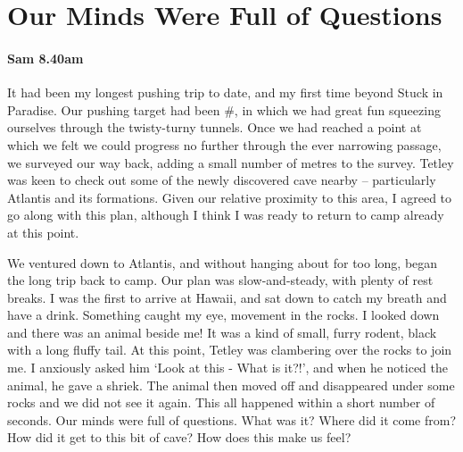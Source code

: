 \begin{marginfigure}
\end{marginfigure}

\section{Our Minds Were Full of Questions}

\paragraph{Sam 8.40am}

It had been my longest pushing trip to date, and my first time beyond Stuck in Paradise. Our pushing target had been \#, in which we had great fun squeezing ourselves through the twisty-turny tunnels. Once we had reached a point at which we felt we could progress no further through the ever narrowing passage, we surveyed our way back, adding a small number of metres to the survey. Tetley was keen to check out some of the newly discovered cave nearby – particularly Atlantis and its formations. Given our relative proximity to this area, I agreed to go along with this plan, although I think I was ready to return to camp already at this point.


We ventured down to Atlantis, and without hanging about for too long, began the long trip back to camp. Our plan was slow-and-steady, with plenty of rest breaks. I was the first to arrive at Hawaii, and sat down to catch my breath and have a drink. Something caught my eye, movement in the rocks. I looked down and there was an animal beside me! It was a kind of small, furry rodent, black with a long fluffy tail. At this point, Tetley was clambering over the rocks to join me. I anxiously asked him `Look at this - What is it?!', and when he noticed the animal, he gave a shriek. The animal then moved off and disappeared under some rocks and we did not see it again. This all happened within a short number of seconds. Our minds were full of questions. What was it? Where did it come from? How did it get to this bit of cave? How does this make us feel? 

